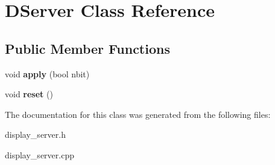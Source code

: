 \hypertarget{class_d_server}{}\section{D\+Server Class Reference}
\label{class_d_server}
\subsection*{Public Member Functions}
\begin{DoxyCompactItemize}
\item 
\mbox{\label{class_d_server_ae1d773a49a30aa008753ddd5cfecab46}} 
void {\bfseries apply} (bool nbit)
\item 
\mbox{\label{class_d_server_a1189254835521db00c3be1d581cdf570}} 
void {\bfseries reset} ()
\end{DoxyCompactItemize}


The documentation for this class was generated from the following files\+:\begin{DoxyCompactItemize}
\item 
display\+\_\+server.\+h\item 
display\+\_\+server.\+cpp\end{DoxyCompactItemize}
